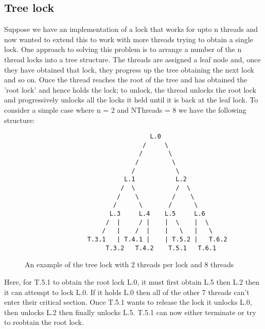\subsection{Tree lock}


Suppose we have an implementation of a lock that works for upto n threads and now wanted to extend this to work with more threads trying to obtain a single lock. One approach to solving this problem is to arrange a number of the n thread locks into a tree structure. The threads are assigned a leaf node and, once they have obtained that lock, they progress up the tree obtaining the next lock and so on. Once the thread reaches the root of the tree and has obtained the 'root lock' and hence holds the lock; to unlock, the thread unlocks the root lock and progressively unlocks all the locks it held until it is back at the leaf lock. To consider a simple case where n = 2 and NThreads = 8 we have the following structure: 

\begin{figure}
\begin{verbatim}
                                  L.0
                                /     \                    
                               /       \
                              /         \
                             /           \
                           L.1           L.2
                          /  \           /  \
                         /    \         /    \
                        /      \       /      \
                       L.3     L.4    L.5     L.6
                      /  |     / |    |  \    |  \
                     /   |    /  |    |   \   |   \
                 T.3.1   | T.4.1 |    | T.5.2 |   T.6.2
                      T.3.2   T.4.2    T.5.1   T.6.1
\end{verbatim}
\caption{An example of the tree lock with 2 threads per lock and 8 threads \label{fig:Tree}}
\end{figure}

Here, for T.5.1 to obtain the root lock L.0, it must first obtain L.5 then L.2 then it can attempt to lock L.0. If it holds L.0 then all of the other 7 threads can't enter their critical section. Once T.5.1 wants to release the lock it unlocks L.0, then unlocks L.2 then finally unlocks L.5. T.5.1 can now either terminate or try to reobtain the root lock.